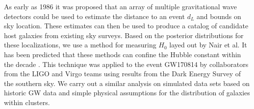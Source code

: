 As early as 1986 it was proposed that an array of multiple gravitational wave detectors could be used to estimate the distance to an event $d_L$ and bounds on sky location\cite{Schutz_1986}.
These estimates can then be used to produce a catalog of candidate host galaxies from existing sky surveys.
Based on the posterior distributions for these localizations, we use a method for measuring $H_0$ layed out by Nair et al\cite{Nair_2018}.
It has been predicted that these methods can confine the Hubble constant within the decade \cite{Chen_2018}.
This technique was applied to the event GW170814 by collaborators from the LIGO and Virgo teams using results from the Dark Energy Survey of the southern sky\cite{GW170814_DES}.
We carry out a similar analysis on simulated data sets based on historic GW data and simple physical assumptions for the distribution of galaxies within clusters.



